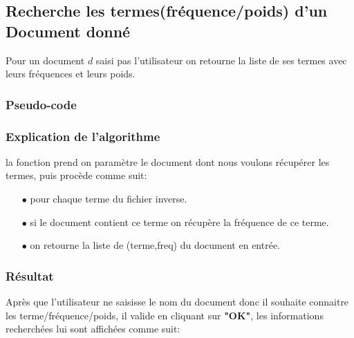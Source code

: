 \documentclass[12pt,a4paper,oneside]{article}
\begin{document}
\subsection{Recherche les termes(fréquence/poids) d'un Document donné}
Pour un document $d$ saisi pas l'utilisateur on retourne la liste de ses termes avec leurs fréquences et leurs poids.

\subsubsection*{Pseudo-code}


\begin{algorithm}[H]
	\DontPrintSemicolon
	


	\;
	\caption{{\sc  }}
	\label{algo:duplicate2}
\end{algorithm}


\subsubsection*{Explication de l'algorithme}
la fonction prend on paramètre le document dont nous voulons récupérer les termes, puis procède comme suit:
\begin{itemize}
	\item[$\bullet$] pour chaque terme du fichier inverse.
	\item[$\bullet$] si le document contient ce terme on récupère la fréquence de ce terme.
	\item[$\bullet$] on retourne la liste de (terme,freq) du document en entrée.
\end{itemize}
\subsubsection*{Résultat}
Après que l'utilisateur ne saisisse le nom du document donc il souhaite connaitre les terme/fréquence/poids, il valide en cliquant sur \textbf{"OK"}, les informations recherchées lui sont affichées comme suit:
\end{document}
